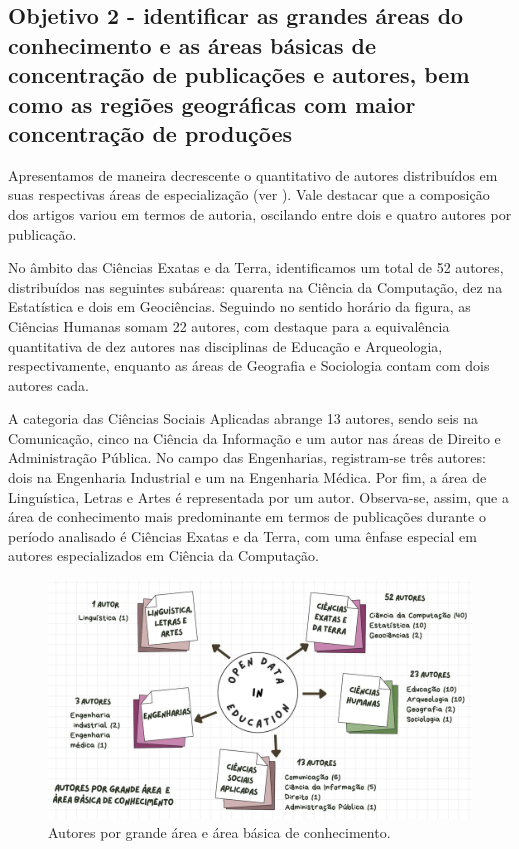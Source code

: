 \documentclass[portuguese]{textolivre}
\begin{document}
\subsection{Objetivo 2 - identificar as grandes áreas do conhecimento e as áreas básicas de concentração de publicações e autores, bem como as regiões geográficas com maior concentração de produções}\label{sec-modelo}
Apresentamos de maneira decrescente o quantitativo de autores distribuídos em suas respectivas áreas de especialização (ver ). Vale destacar que a composição dos artigos variou em termos de autoria, oscilando entre dois e quatro autores por publicação.

No âmbito das Ciências Exatas e da Terra, identificamos um total de 52 autores, distribuídos nas seguintes subáreas: quarenta na Ciência da Computação, dez na Estatística e dois em Geociências. Seguindo no sentido horário da figura, as Ciências Humanas somam 22 autores, com destaque para a equivalência quantitativa de dez autores nas disciplinas de Educação e Arqueologia, respectivamente, enquanto as áreas de Geografia e Sociologia contam com dois autores cada. 

A categoria das Ciências Sociais Aplicadas abrange 13 autores, sendo seis na Comunicação, cinco na Ciência da Informação e um autor nas áreas de Direito e Administração Pública. No campo das Engenharias, registram-se três autores: dois na Engenharia Industrial e um na Engenharia Médica. Por fim, a área de Linguística, Letras e Artes é representada por um autor. Observa-se, assim, que a área de conhecimento mais predominante em termos de publicações durante o período analisado é Ciências Exatas e da Terra, com uma ênfase especial em autores especializados em Ciência da Computação.

\begin{figure}[h]
\centering
\begin{minipage}{0.75\linewidth}    
\includegraphics[width=\linewidth]{Fig5.png}
\caption{Autores por grande área e área básica de conhecimento.}
\label{fig5}
\end{minipage}
\end{figure}
\end{document}
